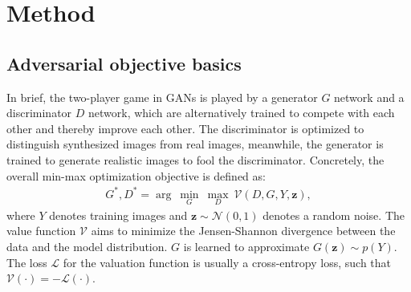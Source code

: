 \documentclass[10pt,twocolumn,letterpaper]{article}
\begin{document}
\section{Method}

\subsection{Adversarial objective basics}
In brief, the two-player game in GANs \cite{goodfellow2014generative} is played by a generator $G$ network and a discriminator $D$ network, which are alternatively trained to compete with each other and thereby improve each other. The discriminator is optimized to distinguish synthesized images from real images, meanwhile, the generator is trained to generate realistic images to fool the discriminator. Concretely, the overall min-max optimization objective is defined as: 
\begin{equation}
\label{equ:GAN}
\begin{split}
G^*, D^* = \arg~\underset{G}{\min}\ \underset{D}{\max}~ \mathcal{V}(D, G, Y, \bm z),
\end{split}
\end{equation}
where $Y$ denotes training images and $\bm z\sim\mathcal{N}(0,1)$ denotes a random noise. The value function $\mathcal{V}$ aims to minimize the Jensen-Shannon divergence between the data and the model distribution. $G$ is learned to approximate $G(\bm z) \sim p(Y)$.  The loss $\mathcal{L}$ for the valuation function is usually a cross-entropy loss, such that $\mathcal{V}(\cdot) = - \mathcal{L}(\cdot)$. 


\end{document}
